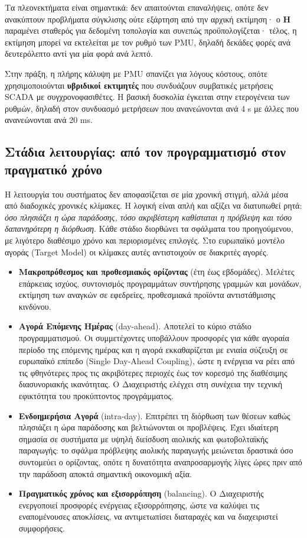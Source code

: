 Τα πλεονεκτήματα είναι σημαντικά: δεν απαιτούνται επαναλήψεις, οπότε δεν ανακύπτουν
προβλήματα σύγκλισης ούτε εξάρτηση από την αρχική εκτίμηση· ο $\mathbf{H}$ παραμένει
σταθερός για δεδομένη τοπολογία και συνεπώς προϋπολογίζεται· τέλος, η εκτίμηση μπορεί να
εκτελείται με τον ρυθμό των PMU, δηλαδή δεκάδες φορές ανά δευτερόλεπτο αντί για μία φορά
ανά λεπτό.

Στην πράξη, η πλήρης κάλυψη με PMU σπανίζει για λόγους κόστους, οπότε χρησιμοποιούνται
\textbf{υβριδικοί εκτιμητές} που συνδυάζουν συμβατικές μετρήσεις SCADA με
συγχρονοφασιθέτες. Η βασική δυσκολία έγκειται στην ετερογένεια των ρυθμών, δηλαδή στον
συνδυασμό μετρήσεων που ανανεώνονται ανά 4 s με άλλες που ανανεώνονται ανά 20 ms.

\subsection{Στάδια λειτουργίας: από τον προγραμματισμό στον πραγματικό χρόνο}

Η λειτουργία του συστήματος δεν αποφασίζεται σε μία χρονική στιγμή, αλλά μέσα από
διαδοχικές χρονικές κλίμακες. Η λογική είναι απλή και αξίζει να διατυπωθεί ρητά: \emph{όσο
πλησιάζει η ώρα παράδοσης, τόσο ακριβέστερη καθίσταται η πρόβλεψη και τόσο δαπανηρότερη η
διόρθωση}. Κάθε στάδιο διορθώνει τα σφάλματα του προηγούμενου, με λιγότερο διαθέσιμο χρόνο
και περιορισμένες επιλογές. Στο ευρωπαϊκό μοντέλο αγοράς (Target Model) οι κλίμακες αυτές
αντιστοιχούν σε διακριτές αγορές.

\begin{itemize}
\item \textbf{Μακροπρόθεσμος και προθεσμιακός ορίζοντας} (έτη έως εβδομάδες). Μελέτες
      επάρκειας ισχύος, συντονισμός προγραμμάτων συντήρησης γραμμών και μονάδων, εκτίμηση
      των αναγκών σε εφεδρείες, προθεσμιακά προϊόντα αντιστάθμισης κινδύνου.
\item \textbf{Αγορά Επόμενης Ημέρας} (day-ahead). Αποτελεί το κύριο στάδιο
      προγραμματισμού. Οι συμμετέχοντες υποβάλλουν προσφορές για κάθε αγοραία περίοδο της
      επόμενης ημέρας και η αγορά εκκαθαρίζεται με ενιαία σύζευξη σε ευρωπαϊκό επίπεδο
      (Single Day-Ahead Coupling), ώστε η ενέργεια να ρέει από τις φθηνότερες προς τις
      ακριβότερες περιοχές έως τον κορεσμό της διαθέσιμης διασυνοριακής ικανότητας. Ο
      Διαχειριστής ελέγχει στη συνέχεια την τεχνική εφικτότητα του προκύπτοντος
      προγράμματος.
\item \textbf{Ενδοημερήσια Αγορά} (intra-day). Επιτρέπει τη διόρθωση των θέσεων καθώς
      πλησιάζει η ώρα παράδοσης και βελτιώνονται οι προβλέψεις. Έχει ιδιαίτερη σημασία σε
      συστήματα με υψηλή διείσδυση αιολικής και φωτοβολταϊκής παραγωγής: το σφάλμα
      πρόβλεψης αιολικής παραγωγής μειώνεται δραστικά όσο συντομεύει ο ορίζοντας, οπότε η
      δυνατότητα αναπροσαρμογής λίγες ώρες πριν από την παράδοση αποκτά σημαντική
      οικονομική αξία.
\item \textbf{Πραγματικός χρόνος και εξισορρόπηση} (balancing). Ο Διαχειριστής ενεργοποιεί
      προσφορές ενέργειας εξισορρόπησης, ώστε να καλύψει τις εναπομένουσες αποκλίσεις, να
      αντιμετωπίσει διαταραχές και να διαχειριστεί συμφορήσεις.
\end{itemize}

